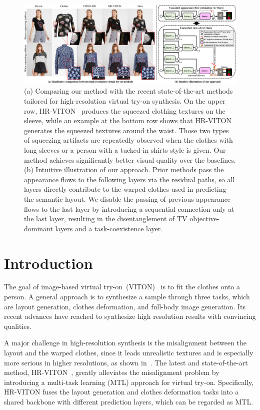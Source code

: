 \documentclass[letterpaper]{article} %
\begin{document}
\begin{figure}[t!]
    \centering
     \includegraphics[width=\linewidth]{fig/fig1.pdf}
     \caption{
     (a) Comparing our method with the recent state-of-the-art methods tailored for high-resolution virtual try-on synthesis. On the upper row, HR-VITON~\cite{lee2022hrviton} produces the squeezed clothing textures on the sleeve, while an example at the bottom row shows that HR-VITON generates the squeezed textures around the waist. Those two types of squeezing artifacts are repeatedly observed when the clothes with long sleeves or a person with a tucked-in shirts style is given. Our method achieves significantly better visual quality over the baselines. (b) Intuitive illustration of our approach. Prior methods pass the appearance flows to the following layers via the residual paths, so all layers directly contribute to the warped clothes used in predicting the semantic layout. We disable the passing of previous appearance flows to the last layer by introducing a sequential connection only at the last layer, resulting in the disentanglement of TV objective-dominant layers and a task-coexistence layer.
     }
     \label{fig_intro_res}
\end{figure}

\section{Introduction}
\label{sec_intro}

The goal of image-based virtual try-on~(VITON)~\cite{han2018viton} is to fit the clothes onto a person.
A general approach is to synthesize a sample through three tasks, which are layout generation, clothes deformation, and full-body image generation.
Its recent advances have reached to synthesize high resolution results with convincing qualities.

A major challenge in high-resolution synthesis is the misalignment between the layout and the warped clothes, since it leads unrealistic textures and is especially more serious in higher resolutions, as shown in~\cite{choi2021viton}.
The latest and state-of-the-art method, HR-VITON~\cite{lee2022hrviton}, greatly alleviates the misalignment problem by introducing a multi-task learning (MTL) approach for virtual try-on.
Specifically, HR-VITON fuses the layout generation and clothes deformation tasks into a shared backbone with different prediction layers, which can be regarded as MTL.
\end{document}
